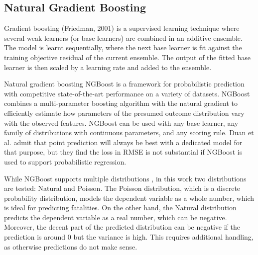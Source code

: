\documentclass[runningheads]{llncs}
\begin{document}
    \subsection{Natural Gradient Boosting}
    \label{section_ngboost}
    Gradient boosting (Friedman, 2001) is a supervised learning technique where several weak learners (or base learners) are combined in an additive ensemble. The model is learnt sequentially, where the next base learner is fit against the training objective residual of the current ensemble. The output of the fitted base learner is then scaled by a learning rate and added to the ensemble.

    Natural gradient boosting NGBoost\cite{duan2020ngboost} is a framework for probabilistic prediction with competitive state-of-the-art performance on a variety of datasets. NGBoost combines a multi-parameter boosting algorithm with the natural gradient to efficiently estimate how parameters of the presumed outcome distribution vary with the observed features. NGBoost can be used with any base learner, any family of distributions with continuous parameters, and any scoring rule. Duan et al. admit that point prediction will always be best with a dedicated model for that purpose, but they find the loss in RMSE is not substantial if NGBoost is used to support probabilistic regression.

    While NGBoost supports multiple distributions \cite{NGBoost_dist}, in this work two distributions are tested: Natural and Poisson. The Poisson distribution, which is a discrete probability distribution, models the dependent variable as a whole number, which is ideal for predicting fatalities. On the other hand, the Natural distribution predicts the dependent variable as a real number, which can be negative. Moreover, the decent part of the predicted distribution can be negative if the prediction is around 0 but the variance is high. This requires additional handling, as otherwise predictions do not make sense.
\end{document}
